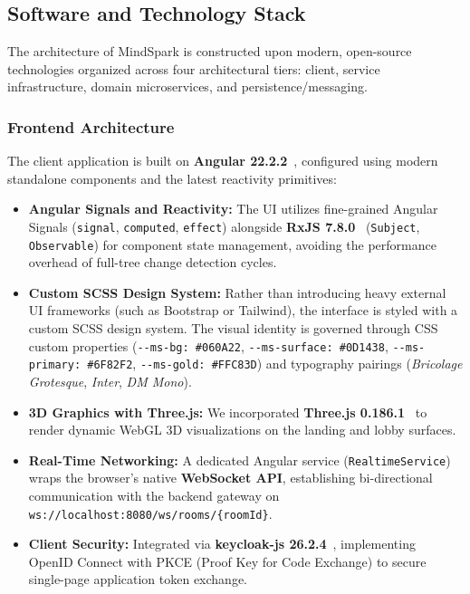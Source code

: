 \subsection{Software and Technology Stack}
\label{subsec:tech_stack}

The architecture of MindSpark is constructed upon modern, open-source technologies organized across four architectural tiers: client, service infrastructure, domain microservices, and persistence/messaging.

\subsubsection{Frontend Architecture}
The client application is built on \textbf{Angular 22.2.2}~\cite{angular2026}, configured using modern standalone components and the latest reactivity primitives:
\begin{itemize}[leftmargin=1.5em]
    \item \textbf{Angular Signals and Reactivity:} The UI utilizes fine-grained Angular Signals (\texttt{signal}, \texttt{computed}, \texttt{effect}) alongside \textbf{RxJS 7.8.0}~\cite{rxjs2026} (\texttt{Subject}, \texttt{Observable}) for component state management, avoiding the performance overhead of full-tree change detection cycles.
    \item \textbf{Custom SCSS Design System:} Rather than introducing heavy external UI frameworks (such as Bootstrap or Tailwind), the interface is styled with a custom SCSS design system. The visual identity is governed through CSS custom properties (\texttt{-{}-ms-bg: \#060A22}, \texttt{-{}-ms-surface: \#0D1438}, \texttt{-{}-ms-primary: \#6F82F2}, \texttt{-{}-ms-gold: \#FFC83D}) and typography pairings (\textit{Bricolage Grotesque}, \textit{Inter}, \textit{DM Mono}).
    \item \textbf{3D Graphics with Three.js:} We incorporated \textbf{Three.js 0.186.1}~\cite{threejs2026} to render dynamic WebGL 3D visualizations on the landing and lobby surfaces.
    \item \textbf{Real-Time Networking:} A dedicated Angular service (\texttt{RealtimeService}) wraps the browser's native \textbf{WebSocket API}, establishing bi-directional communication with the backend gateway on \texttt{ws://localhost:8080/ws/rooms/\{roomId\}}.
    \item \textbf{Client Security:} Integrated via \textbf{keycloak-js 26.2.4}~\cite{keycloak2026}, implementing OpenID Connect with PKCE (Proof Key for Code Exchange) to secure single-page application token exchange.
\end{itemize}


